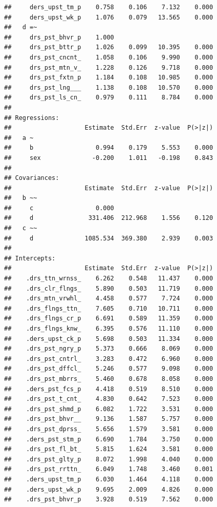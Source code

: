 \documentclass[
]{book}
\begin{document}
\begin{verbatim}
##     ders_upst_tm_p    0.758    0.106    7.132    0.000
##     ders_upst_wk_p    1.076    0.079   13.565    0.000
##   d =~                                                
##     drs_pst_bhvr_p    1.000                           
##     drs_pst_bttr_p    1.026    0.099   10.395    0.000
##     drs_pst_cncnt_    1.058    0.106    9.990    0.000
##     drs_pst_mtn_v_    1.228    0.126    9.718    0.000
##     drs_pst_fxtn_p    1.184    0.108   10.985    0.000
##     drs_pst_lng___    1.138    0.108   10.570    0.000
##     drs_pst_ls_cn_    0.979    0.111    8.784    0.000
## 
## Regressions:
##                    Estimate  Std.Err  z-value  P(>|z|)
##   a ~                                                 
##     b                 0.994    0.179    5.553    0.000
##     sex              -0.200    1.011   -0.198    0.843
## 
## Covariances:
##                    Estimate  Std.Err  z-value  P(>|z|)
##   b ~~                                                
##     c                 0.000                           
##     d               331.406  212.968    1.556    0.120
##   c ~~                                                
##     d              1085.534  369.380    2.939    0.003
## 
## Intercepts:
##                    Estimate  Std.Err  z-value  P(>|z|)
##    .drs_ttn_wrnss_    6.262    0.548   11.437    0.000
##    .drs_clr_flngs_    5.890    0.503   11.719    0.000
##    .drs_mtn_vrwhl_    4.458    0.577    7.724    0.000
##    .drs_flngs_ttn_    7.605    0.710   10.711    0.000
##    .drs_flngs_cr_p    6.691    0.589   11.359    0.000
##    .drs_flngs_knw_    6.395    0.576   11.110    0.000
##    .ders_upst_ck_p    5.698    0.503   11.334    0.000
##    .drs_pst_ngry_p    5.373    0.666    8.069    0.000
##    .drs_pst_cntrl_    3.283    0.472    6.960    0.000
##    .drs_pst_dffcl_    5.246    0.577    9.098    0.000
##    .drs_pst_mbrrs_    5.460    0.678    8.058    0.000
##    .ders_pst_fcs_p    4.418    0.519    8.510    0.000
##    .drs_pst_t_cnt_    4.830    0.642    7.523    0.000
##    .drs_pst_shmd_p    6.082    1.722    3.531    0.000
##    .drs_pst_bhvr__    9.136    1.587    5.757    0.000
##    .drs_pst_dprss_    5.656    1.579    3.581    0.000
##    .ders_pst_stm_p    6.690    1.784    3.750    0.000
##    .drs_pst_fl_bt_    5.815    1.624    3.581    0.000
##    .drs_pst_glty_p    8.072    1.998    4.040    0.000
##    .drs_pst_rrttn_    6.049    1.748    3.460    0.001
##    .ders_upst_tm_p    6.030    1.464    4.118    0.000
##    .ders_upst_wk_p    9.695    2.009    4.826    0.000
##    .drs_pst_bhvr_p    3.928    0.519    7.562    0.000

\end{verbatim}
\end{document}
